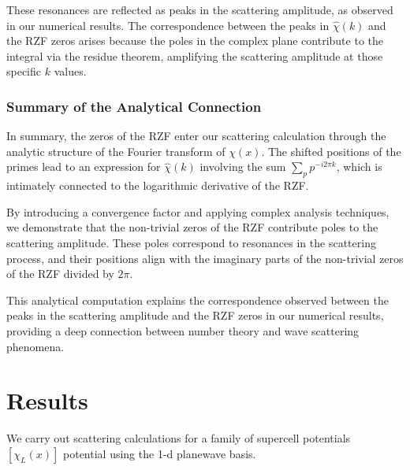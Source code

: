 \documentclass[11pt, oneside]{article}
\begin{document}
These resonances are reflected as peaks in the scattering amplitude, as observed in our numerical results. The correspondence between the peaks in $\hat{\chi}(k)$ and the RZF zeros arises because the poles in the complex plane contribute to the integral via the residue theorem, amplifying the scattering amplitude at those specific $k$ values.

\subsubsection{Summary of the Analytical Connection}

In summary, the zeros of the RZF enter our scattering calculation through the analytic structure of the Fourier transform of $\chi(x)$. The shifted positions of the primes lead to an expression for $\hat{\chi}(k)$ involving the sum $\sum_{p} p^{-i 2\pi k}$, which is intimately connected to the logarithmic derivative of the RZF.

By introducing a convergence factor and applying complex analysis techniques, we demonstrate that the non-trivial zeros of the RZF contribute poles to the scattering amplitude. These poles correspond to resonances in the scattering process, and their positions align with the imaginary parts of the non-trivial zeros of the RZF divided by $2\pi$.

This analytical computation explains the correspondence observed between the peaks in the scattering amplitude and the RZF zeros in our numerical results, providing a deep connection between number theory and wave scattering phenomena.


\section{Results}
We carry out scattering calculations for a family of supercell potentials $[\chi_L(x)]$ potential using the 1-d planewave basis.
\end{document}
